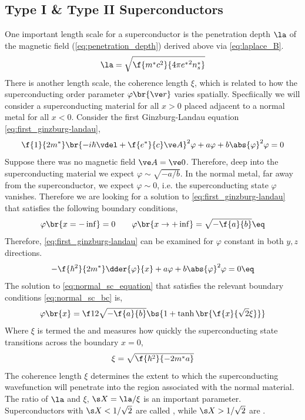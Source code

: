 \documentclass{article}
\newcommand{\vp}{\varphi}
\begin{document}
\subsection{Type I \& Type II Superconductors}
One important length scale for a superconductor is the penetration depth $\la$ of the magnetic field (\cref{eq:penetration_depth}) derived above via \cref{eq:laplace_B}.
\[ \la = \sqrt{\f{m^* c^2}{4 \pi {e^*}^2 n_s^*}} \]
There is another length scale, the coherence length $\xi$, which is related to how the superconducting order parameter $\vp\br{\ve r}$ varies spatially. Specfiically we will consider a superconducting material for all $x > 0$ placed adjacent to a normal metal for all $x < 0$. Consider the first Ginzburg-Landau equation \cref{eq:first_ginzburg-landau},
\[ \f{1}{2m^{*}}\br{-i\hbar \vdel + \f{e^*}{c} \ve A}^2 \vp + a \vp + b \abs{\vp}^2\vp = 0 \]
Suppose there was no magnetic field $\ve A = \ve 0$. Therefore, deep into the superconducting material we expect $\vp \sim \sqrt{-a/b}$. In the normal metal, far away from the superconductor, we expect $\vp \sim 0$, i.e. the superconducting state $\vp$ vanishes. Therefore we are looking for a solution to \cref{eq:first_ginzburg-landau} that satisfies the following boundary conditions,
\[ \vp\br{x = -\inf} = 0 \qquad \vp\br{x \to +\inf} = \sqrt{-\f{a}{b}} \eq \label{eq:normal_sc_bc}\]
Therefore, \cref{eq:first_ginzburg-landau} can be examined for $\vp$ constant in both $y,z$ directions.
\[ - \f{\hbar^2}{2m^*}\dder{\vp}{x} + a \vp + b \abs{\vp}^2 \vp = 0 \eq \label{eq:normal_sc_equation}\]
The solution to \cref{eq:normal_sc_equation} that satisfies the relevant boundary conditions \cref{eq:normal_sc_bc} is,
\[ \varphi\br{x} = \f12\sqrt{-\f{a}{b}} \bs{1 + \tanh\br{\f{x}{\sqrt{2}\xi}}} \]
Where $\xi$ is termed the  and measures how quickly the superconducting state transitions across the boundary $x=0$,
\[ \xi = \sqrt{\f{\hbar^2}{-2 m^* a}} \]
The coherence length $\xi$ determines the extent to which the superconducting wavefunction will penetrate into the region associated with the normal material. The ratio of $\la$ and $\xi$, $\s X = \la / \xi$ is an important parameter. Superconductors with $\s X < 1/\sqrt{2}$ are called , while $\s X>1/\sqrt{2}$ are . \\
\end{document}
